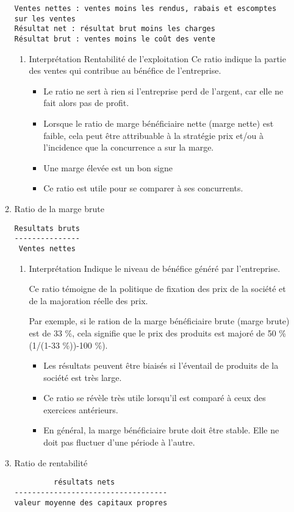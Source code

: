\documentclass[11pt]{article}
\begin{document}
\begin{enumerate}
\begin{enumerate}
\begin{verbatim}
Ventes nettes : ventes moins les rendus, rabais et escomptes sur les ventes
Résultat net : résultat brut moins les charges
Résultat brut : ventes moins le coût des vente
\end{verbatim}
\begin{enumerate}
\item Interprétation
\label{sec:org0535613}
Rentabilité de l'exploitation
Ce ratio indique la partie des ventes qui contribue au bénéfice de l'entreprise.
\begin{itemize}
\item Le ratio ne sert à rien si l'entreprise perd de l'argent, car elle ne fait
alors pas de profit.
\item Lorsque le ratio de marge bénéficiaire nette (marge nette) est faible, cela
peut être attribuable à la stratégie prix et/ou à l'incidence que la
concurrence a sur la marge.
\item Une marge élevée est un bon signe
\item Ce ratio est utile pour se comparer à ses concurrents.
\end{itemize}
\end{enumerate}
\item Ratio de la marge brute
\label{sec:orgb9ddc11}
\begin{verbatim}
Resultats bruts
---------------
 Ventes nettes
\end{verbatim}
\begin{enumerate}
\item Interprétation
\label{sec:org6e38c28}
Indique le niveau de bénéfice généré par l'entreprise.

Ce ratio témoigne de la politique de fixation des prix de la société et de la majoration
réelle des prix.

Par exemple, si le ration de la marge bénéficiaire brute (marge brute) est de 33 \%,
cela signifie que le prix des produits est majoré de 50 \% (1/(1-33 \%))-100 \%).
\begin{itemize}
\item Les résultats peuvent être biaisés si l'éventail de produits de la société est
très large.
\item Ce ratio se révèle très utile lorsqu'il est comparé à ceux des exercices
antérieurs.
\item En général, la marge bénéficiaire brute doit être stable. Elle ne doit pas
fluctuer d'une période à l'autre.
\end{itemize}
\end{enumerate}
\item Ratio de rentabilité
\label{sec:orgb1f96b0}
\begin{verbatim}
         résultats nets
-----------------------------------
valeur moyenne des capitaux propres


\end{verbatim}
\end{enumerate}
\end{enumerate}
\end{document}
